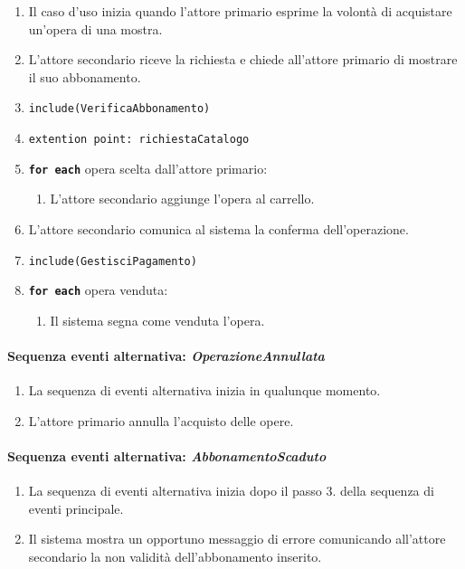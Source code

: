 \documentclass{article}
\begin{document}
		\begin{enumerate}[itemsep=8pt,parsep=0pt]
		
				\item Il caso d'uso inizia quando l'attore primario esprime la volontà di acquistare un'opera di una mostra.
		
				\item L'attore secondario riceve la richiesta e chiede all'attore primario di mostrare il suo abbonamento.

				\item \texttt{include(VerificaAbbonamento)}

				\item \texttt{extention point: richiestaCatalogo}

				\item \texttt{\textbf{for each}} opera scelta dall'attore primario:
					\begin{enumerate}	[leftmargin=28pt]
						\item L'attore secondario aggiunge l'opera al carrello.
		  			\end{enumerate}
				\item L'attore secondario comunica al sistema la conferma dell'operazione.
				\item \texttt{include(GestisciPagamento)}
				\item \texttt{\textbf{for each}} opera venduta:
					\begin{enumerate}	[leftmargin=28pt]
						\item Il sistema segna come venduta l'opera.
		  			\end{enumerate}
  			\end{enumerate}				

	\paragraph{Sequenza eventi alternativa: \emph{OperazioneAnnullata}}
		\begin{enumerate}[itemsep=8pt,parsep=0pt]
				\item La sequenza di eventi alternativa inizia in qualunque momento.
				\item L'attore primario annulla l'acquisto delle opere.
		\end{enumerate}

	\paragraph{Sequenza eventi alternativa: \emph{AbbonamentoScaduto}}
		\begin{enumerate}[itemsep=8pt,parsep=0pt]
				\item La sequenza di eventi alternativa inizia dopo il passo 3. della sequenza di eventi principale.
				\item Il sistema mostra un opportuno messaggio di errore comunicando all'attore secondario la non validità dell'abbonamento inserito.
		\end{enumerate}
\end{document}
